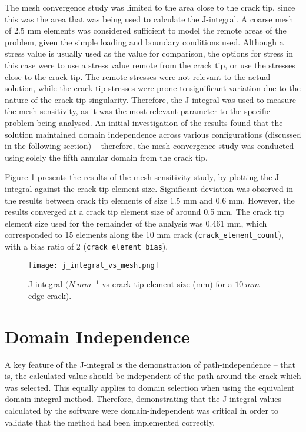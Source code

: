 The mesh convergence study was limited to the area close to the crack tip, since this was the area that was being used to calculate the J-integral. A coarse mesh of 2.5 mm elements was considered sufficient to model the remote areas of the problem, given the simple loading and boundary conditions used. Although a stress value is usually used as the value for comparison, the options for stress in this case were to use a stress value remote from the crack tip, or use the stresses close to the crack tip. The remote stresses were not relevant to the actual solution, while the crack tip stresses were prone to significant variation due to the nature of the crack tip singularity. Therefore, the J-integral was used to measure the mesh sensitivity, as it was the most relevant parameter to the specific problem being analysed. An initial investigation of the results found that the solution maintained domain independence across various configurations (discussed in the following section) -- therefore, the mesh convergence study was conducted using solely the fifth annular domain from the crack tip.

Figure \ref{fig:j_integral_vs_mesh} presents the results of the mesh sensitivity study, by plotting the J-integral against the crack tip element size. Significant deviation was observed in the results between crack tip elements of size 1.5 mm and 0.6 mm. However, the results converged at a crack tip element size of around 0.5 mm. The crack tip element size used for the remainder of the analysis was 0.461 mm, which corresponded to 15 elements along the 10 mm crack (\texttt{crack\_element\_count}), with a bias ratio of 2 (\texttt{crack\_element\_bias}).

\begin{figure}[H]
	\centering
	\texttt{[image: j\_integral\_vs\_mesh.png]}
	\caption{J-integral $(N\ mm^{-1}$ vs crack tip element size (mm) for a $10\ mm$ edge crack).}
	\label{fig:j_integral_vs_mesh}
\end{figure}

\section{Domain Independence}

A key feature of the J-integral is the demonstration of path-independence -- that is, the calculated value should be independent of the path around the crack which was selected. This equally applies to domain selection when using the equivalent domain integral method. Therefore, demonstrating that the J-integral values calculated by the software were domain-independent was critical in order to validate that the method had been implemented correctly.

